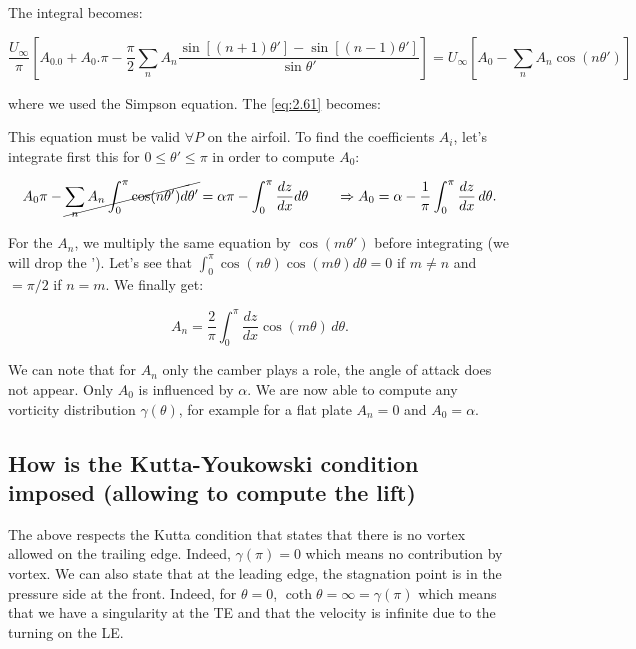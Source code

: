 \documentclass[british,french,11pt, a4paper, openany]{article}
\renewcommand{\theor}[1]{\adjustbox{minipage=\linewidth-2\fboxsep-2\fboxrule,fbox}{\textsc{}#1}}
\begin{document}
The integral becomes: 

\begin{equation}
\frac{U_\infty}{\pi} \left[ A_0.0 + A_0. \pi - \frac{\pi}{2} \sum _n A_n \frac{\sin [(n+1)\theta '] - \sin [(n-1)\theta ']}{\sin \theta '} \right] = U_\infty \left[ A_0 - \sum _n A_n \cos (n\theta ') \right]
\end{equation}

where we used the Simpson equation. The \eqref{eq:2.61} becomes: 

\begin{center}
	\theor{
		\begin{equation}
		A_0 - \sum _n A_n \cos (n\theta ') = \alpha - \left( \frac{dz}{dx} \right)'
		\end{equation}
	}
\end{center}

This equation must be valid $\forall P$ on the airfoil. To find the coefficients $A_i$, let's integrate first this for $0\leq \theta ' \leq \pi$ in order to compute $A_0$: 

\begin{equation}
A_0\pi - \cancel{\sum _n A_n \int _0 ^\pi \cos (n\theta ')d\theta '} = \alpha\pi - \int _0 ^\pi \frac{dz}{dx}d\theta\qquad \Rightarrow A_0 = \alpha - \frac{1}{\pi} \int _0^\pi \frac{dz}{dx}\, d\theta.
\end{equation}

For the $A_n$, we multiply the same equation by $\cos (m\theta ')$ before integrating (we will drop the '). Let's see that $\int _0 ^\pi \cos (n\theta)\cos (m\theta) d\theta = 0$ if $ m \neq n $ and $= \pi /2$ if $n = m$. We finally get:

\begin{equation}
A_n = \frac{2}{\pi} \int _0 ^\pi \frac{dz}{dx} \cos (m\theta) \, d\theta .
\end{equation}

We can note that for $A_n$ only the camber plays a role, the angle of attack does not appear. Only $A_0$ is influenced by $\alpha$. We are now able to compute any vorticity distribution $\gamma (\theta)$, for example for a flat plate $A_n = 0$ and $A_0 = \alpha$. 

\subsection{How is the Kutta-Youkowski condition imposed (allowing to compute the lift)}

The above respects the Kutta condition that states that there is no vortex allowed on the trailing edge. Indeed, $\gamma (\pi) = 0$  which means no contribution by vortex. We can also state that at the leading edge, the stagnation point is in the pressure side at the front. Indeed, for $\theta = 0$, $\coth \theta = \infty = \gamma (\pi )$ which means that we have a singularity at the TE and that the velocity is infinite due to the turning on the LE. 
\end{document}
